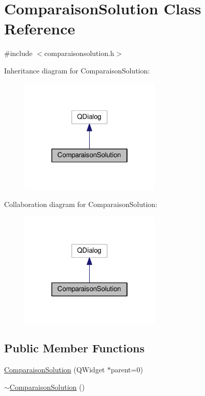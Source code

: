 \hypertarget{classComparaisonSolution}{}\section{Comparaison\+Solution Class Reference}
\label{classComparaisonSolution}


{\ttfamily \#include $<$comparaisonsolution.\+h$>$}



Inheritance diagram for Comparaison\+Solution\+:
\nopagebreak
\begin{figure}[H]
\begin{center}
\leavevmode
\includegraphics[width=190pt]{classComparaisonSolution__inherit__graph}
\end{center}
\end{figure}


Collaboration diagram for Comparaison\+Solution\+:
\nopagebreak
\begin{figure}[H]
\begin{center}
\leavevmode
\includegraphics[width=190pt]{classComparaisonSolution__coll__graph}
\end{center}
\end{figure}
\subsection*{Public Member Functions}
\begin{DoxyCompactItemize}
\item 
\hyperlink{classComparaisonSolution_a7fc9723f5a627d53e331719c3f47c7cc}{Comparaison\+Solution} (Q\+Widget $\ast$parent=0)
\item 
\hyperlink{classComparaisonSolution_a07a910b473173981273789934cf34e7f}{$\sim$\+Comparaison\+Solution} ()
\end{DoxyCompactItemize}


